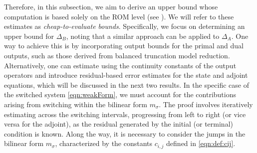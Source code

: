 \documentclass[reqno]{amsart}
\newcommand{\switch}{\sigma}
\newcommand{\BoundControlA}{\Delta_{A}}
\newcommand{\BoundControlB}{\Delta_{B}}
\newcommand{\abbr}[1]{\textsf{#1}\xspace}
\newcommand{\ROM}{\abbr{ROM}}
\begin{document}
Therefore, in this subsection, we aim to derive an upper bound whose computation is based solely on the \ROM level (see ). We will refer to these estimates as \emph{cheap-to-evaluate bounds}. Specifically, we focus on determining an upper bound for $\BoundControlB$, noting that a similar approach can be applied to $\BoundControlA$.
One way to achieve this is by incorporating output bounds for the primal and dual outputs, such as those derived from balanced truncation model reduction. Alternatively, one can estimate using the continuity constants of the output operators and introduce residual-based error estimates for the state and adjoint equations, which will be discussed in the next two results.
In the specific case of the switched system \eqref{eqn:weakForm}, we must account for the contributions arising from switching within the bilinear form $m_\switch$. The proof involves iteratively estimating across the switching intervals, progressing from left to right (or vice versa for the adjoint), as the residual generated by the initial (or terminal) condition is known. Along the way, it is necessary to consider the jumps in the bilinear form $m_\switch$, characterized by the constants $c_{i,j}$ defined in \eqref{eqn:def:cij}.
%
\end{document}
